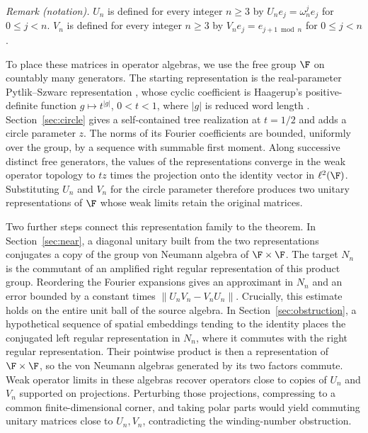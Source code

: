 \noindent\textit{Remark (notation).} $U_n$ is defined for every integer $n\geq3$ by $U_ne_j=\omega_n^je_j$ for $0\leq j<n$. $V_n$ is defined for every integer $n\geq3$ by $V_ne_j=e_{j+1\bmod n}$ for $0\leq j<n$.


To place these matrices in operator algebras, we use the free group
$\F$ on countably many generators.  The starting representation
is the real-parameter Pytlik--Szwarc representation
\cite[\S2.3, Equation~(5)]{PS1986}, whose cyclic coefficient is Haagerup's
positive-definite function $g\mapsto t^{|g|}$, $0<t<1$, where $|g|$ is
reduced word length \cite[Lemma~1.2]{Haa1979}.
Section~\ref{sec:circle} gives a self-contained
tree realization at $t=1/2$ and adds a circle parameter $z$.
The norms of its Fourier coefficients are bounded, uniformly over the
group, by a sequence with summable first moment.  Along successive
distinct free generators, the values of the representations converge
in the weak operator topology to $tz$ times the projection onto the
identity vector in $\ell^2(\F)$.  Substituting $U_n$ and $V_n$ for the
circle parameter therefore produces two unitary representations of
$\F$ whose weak limits retain the original matrices.

Two further steps connect this representation family to the theorem.
In Section~\ref{sec:near}, a diagonal unitary built from the two
representations conjugates a copy of the group von Neumann algebra of
$\F\times\F$.  The target $N_n$ is the commutant of an amplified right
regular representation of this product group.  Reordering the Fourier
expansions gives an approximant in $N_n$ and an error bounded by a
constant times $\|U_nV_n-V_nU_n\|$.  Crucially, this estimate holds on the
entire unit ball of the source algebra.  In
Section~\ref{sec:obstruction}, a hypothetical sequence of spatial
embeddings tending to the identity places the conjugated left regular
representation in $N_n$, where it commutes with the right regular
representation.  Their pointwise product is then a representation of
$\F\times\F$, so the von Neumann algebras generated by its two factors
commute.  Weak operator
limits in these algebras recover operators close to copies of
$U_n$ and $V_n$ supported on projections.  Perturbing those projections,
compressing to a common finite-dimensional corner, and taking polar
parts would yield
commuting unitary matrices close to $U_n,V_n$, contradicting the
winding-number obstruction.
